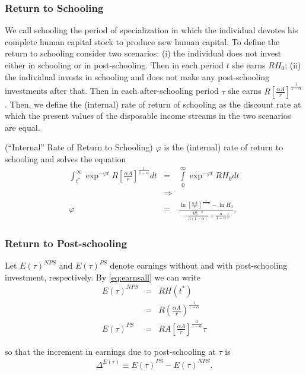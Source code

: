\subsubsection{Return to Schooling}
We call schooling the period of specialization in which the individual devotes his complete human capital stock to produce new human capital. To define the return to schooling consider two scenarios: (i) the individual does not invest either in schooling or in post-schooling. Then in each period $t$ she earns $RH_{0}$; (ii) the individual invests in schooling and does not make any post-schooling investments after that. Then in each after-schooling period $\tau$ she earns $R \left[ \frac{\alpha A}{r} \right]^{\frac{1}{1-\alpha}}$. Then, we define the (internal) rate of return of schooling as the discount rate at which the present values of the disposable income streams in the two scenarios are equal.

\begin{definition} (``Internal'' Rate of Return to Schooling)
$\varphi$ is the (internal) rate of return to schooling and solves the equation
\begin{eqnarray}
\int _{t^*} ^{\infty} \exp^{- \varphi t} R \left[ \frac{\alpha A}{r} \right]^{\frac{1}{1-\alpha}} dt &=& \int \limits _{0} ^{\infty} \exp^{- \varphi t} R H_{0} dt \nonumber \\
&\Rightarrow& \nonumber \\
\varphi &=& \frac{\ln \left[ \frac{\alpha A}{r} \right]^{\frac{1}{1 - \alpha}} - \ln H_{0}}{-\frac{H_0^{1-\alpha}}{A(1-\alpha)}+\frac{\alpha}{1-\alpha} \frac{1}{r}}.
\end{eqnarray}
\end{definition}

\subsubsection{Return to Post-schooling}
Let $E(\tau)^{NPS}$ and $E(\tau)^{PS}$ denote earnings without and with post-schooling investment, respectively. By \eqref{eq:earnsall} we can write
\begin{eqnarray}
E(\tau)^{NPS} &=& R H(t^*) \\ \nonumber
&=& R \left( \frac{\alpha A}{r} \right)^{\frac{1}{1 - \alpha}} \\ \nonumber
E(\tau)^{PS} &=& R A \left[ \frac{\alpha A}{r} \right]^{\frac{\alpha}{1-\alpha}} \tau
\end{eqnarray}

\noindent so that the increment in earnings due to post-schooling at $\tau$ is
\begin{eqnarray}
\Delta^{E(\tau)} \equiv E(\tau)^{PS} - E(\tau)^{NPS}.
\end{eqnarray}

